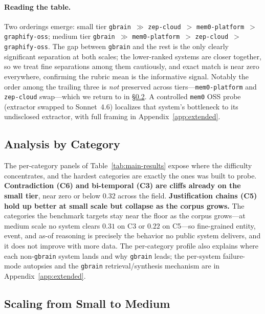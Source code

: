 \paragraph{Reading the table.}
Two orderings emerge: small tier \texttt{gbrain}~$\gg$ \texttt{zep-cloud}~$>$
\texttt{mem0-platform}~$>$ \texttt{graphify-oss}; medium tier \texttt{gbrain}~$\gg$
\texttt{mem0-platform}~$>$ \texttt{zep-cloud}~$>$ \texttt{graphify-oss}. The gap
between \texttt{gbrain} and the rest is the only clearly significant separation at
both scales; the lower-ranked systems are closer together, so we treat fine
separations among them cautiously, and exact match is near zero everywhere,
confirming the rubric mean is the informative signal. Notably the order among the
trailing three is \emph{not} preserved across tiers---\texttt{mem0-platform} and
\texttt{zep-cloud} swap---which we return to in \S\ref{sec:exp:scaling}. A
controlled \texttt{mem0} OSS probe (extractor swapped to Sonnet~4.6) localizes
that system's bottleneck to its undisclosed extractor, with full framing in
Appendix~\ref{app:extended}.

\subsection{Analysis by Category}
\label{sec:exp:bytype}

The per-category panels of Table~\ref{tab:main-results} expose where the
difficulty concentrates, and the hardest categories are exactly the ones
\bench{} was built to probe. \textbf{Contradiction (C6) and bi-temporal (C3) are
cliffs already on the small tier}, near zero or below $0.32$ across the field.
\textbf{Justification chains (C5) hold up better at small scale but collapse as
the corpus grows.} The categories the benchmark targets stay near the floor as
the corpus grows---at medium scale no system clears $0.31$ on C3 or $0.22$ on
C5---so fine-grained entity, event, and as-of reasoning is precisely the behavior
no public system delivers, and it does not improve with more data. The
per-category profile also explains where each non-\texttt{gbrain} system lands and
why \texttt{gbrain} leads; the per-system failure-mode autopsies and the
\texttt{gbrain} retrieval/synthesis mechanism are in Appendix~\ref{app:extended}.

\subsection{Scaling from Small to Medium}
\label{sec:exp:scaling}

